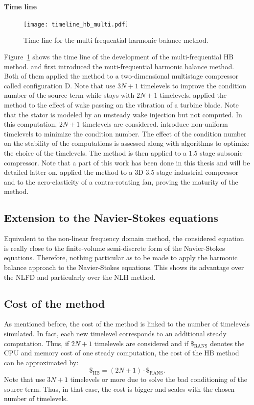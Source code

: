 \paragraph{Time line}
\begin{figure}[htbp]
  \centering
  \texttt{[image: timeline\_hb\_multi.pdf]}
  \caption{Time line for the multi-frequential harmonic balance method.}
  \label{fig:timeline_hb_multi}
\end{figure}
Figure~\ref{fig:timeline_hb_multi} shows the time line of the
development of the multi-frequential HB method.
\citet{Gopinath2007} and \citet{Ekici2007}
first introduced the muti-frequential harmonic balance
method. Both of them applied the method to
a two-dimensional multistage compressor called
configuration D. Note that \citet{Ekici2007} use
$3N+1$ timelevels to improve the condition number
of the source term while \citet{Gopinath2007}
stays with $2N+1$ timelevels.
\citet{Ekici2008a} applied the method
to the effect of wake passing on the vibration of
a turbine blade. Note that the stator is modeled
by an unsteady wake injection but not computed.
In this computation, $2N+1$ timelevels are considered.
\citet{JGuedeney2013} introduce non-uniform 
timelevels to minimize the condition number. 
The effect of the condition number on the stability
of the computations is assessed along with algorithms
to optimize the choice of the timelevels.
The method is then applied
to a $1.5$ stage subsonic compressor.
Note that a part of this work has been done in this
thesis and will be detailed latter on.
\citet{JSicot2013} applied the method to a $3$D
$3.5$ stage industrial compressor and to the
aero-elasticity of a contra-rotating fan, proving
the maturity of the method.

\subsection{Extension to the Navier-Stokes equations}
Equivalent to the non-linear frequency domain method, the
considered equation is really close to the finite-volume
semi-discrete form of the Navier-Stokes equations. Therefore,
nothing particular as to be made to apply the harmonic balance approach
to the Navier-Stokes equations.
This shows its advantage over the NLFD and particularly over the NLH method.


\subsection{Cost of the method}
As mentioned before, the cost of the method is linked to
the number of timelevels simulated.
In fact, each new timelevel corresponds to an additional steady computation.
Thus, if $2N+1$ timelevels are considered and if $\mathdollar_{\text{RANS}}$ 
denotes the CPU and memory cost of
one steady computation, the cost of the HB method can be 
approximated by:
\begin{equation}
	\mathdollar_{\text{HB}} = (2N+1) \cdot \mathdollar_{\text{RANS}}.
\end{equation}
Note that \citet{Ekici2007,Ekici2008a} use $3N+1$
timelevels or more due to solve the bad conditioning of the
source term. Thus, in that
case, the cost is bigger and scales with the chosen number
of timelevels.